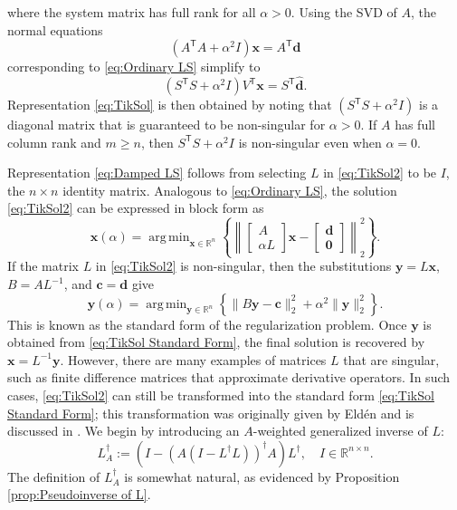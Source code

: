 \documentclass[12pt]{article}
\newcommand{\cVec}{\mathbf{c}}	%
\newcommand{\dVec}{\mathbf{d}}	%
\newcommand{\xVec}{\mathbf{x}}	%
\newcommand{\trans}[1]{{#1}^\mathsf{T}}	%
\newcommand{\pinv}[1]{{#1}^\dagger}	%
\newcommand{\regparam}{\alpha}  %
\DeclareMathOperator*{\argmin}{arg\,min}
\newcommand{\svd}[1]{\widehat{#1}}	%
\begin{document}
where the system matrix has full rank for all $\regparam > 0$. Using the SVD of $A$, the normal equations 
\[(\trans{A}A + \regparam^2 I)\xVec = \trans{A}\dVec\]
corresponding to \eqref{eq:Ordinary LS} simplify to
\[(\trans{S}S + \regparam^2 I)\trans{V}\xVec = \trans{S}\svd{\dVec}.\]
Representation \eqref{eq:TikSol} is then obtained by noting that $(\trans{S}S + \regparam^2 I)$ is a diagonal matrix that is guaranteed to be non-singular for $\regparam > 0$. If $A$ has full column rank and $m \geq n$, then $\trans{S}S + \regparam^2 I$ is non-singular even when $\regparam = 0$. \par
Representation \eqref{eq:Damped LS} follows from selecting $L$ in \eqref{eq:TikSol2} to be $I$, the $n \times n$ identity matrix. Analogous to \eqref{eq:Ordinary LS}, the solution \eqref{eq:TikSol2} can be expressed in block form as
\begin{equation}
\xVec(\regparam) = \argmin_{\xVec \in \mathbb{R}^n} \left\{\left\| \begin{bmatrix}
A \\
\regparam L
\end{bmatrix}\xVec - \begin{bmatrix}
\dVec \\
\bm{0}
\end{bmatrix} \right\|_2^2\right\}.
\label{eq:TikSol3}
\end{equation}
If the matrix $L$ in \eqref{eq:TikSol2} is non-singular, then the substitutions $\mathbf{y} = L\xVec$, $B = A{L}^{-1}$, and $\cVec = \dVec$ give
\begin{equation}
\mathbf{y}(\regparam) = \argmin_{\mathbf{y} \in \mathbb{R}^n} \left\{\|B\mathbf{y} - \cVec\|_2^2 + \regparam^2\|\mathbf{y}\|_2^2\right\}.
\label{eq:TikSol Standard Form}
\end{equation}
This is known as the standard form of the regularization problem. Once $\mathbf{y}$ is obtained from \eqref{eq:TikSol Standard Form}, the final solution is recovered by $\xVec = L^{-1}\mathbf{y}$.  However, there are many examples of matrices $L$ that are singular, such as finite difference matrices that approximate derivative operators. In such cases, \eqref{eq:TikSol2} can still be transformed into the standard form \eqref{eq:TikSol Standard Form}; this transformation was originally given by Eld\'{e}n \cite{Elden} and is discussed in \cite{Hansen:98}. We begin by introducing an $A$-weighted generalized inverse of $L$:
\begin{equation}
\label{eq:A-weighted inverse of L}
    \pinv{L}_A := \left(I - \pinv{\left(A\left(I - \pinv{L}L\right)\right)}A\right)\pinv{L}, \quad I \in \mathbb{R}^{n \times n}.
\end{equation}
The definition of $\pinv{L}_A$ is somewhat natural, as evidenced by Proposition \ref{prop:Pseudoinverse of L}.
\end{document}
